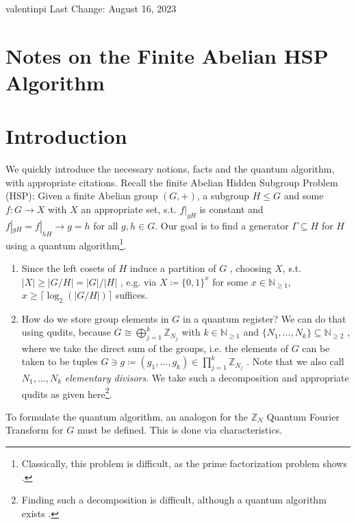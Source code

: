 \documentclass[10pt]{amsart}
\numberwithin{equation}{section}
\theoremstyle{definition}
\theoremstyle{remark}
\begin{document}
    valentinpi \hfill Last Change: August 16, 2023

    \section*{Notes on the Finite Abelian HSP Algorithm}

    \section{Introduction} \label{introduction}

    We quickly introduce the necessary notions, facts and the quantum algorithm, with appropriate citations. Recall the finite Abelian Hidden Subgroup Problem (HSP): Given a finite Abelian group \((G, +)\), a subgroup \(H \leq G\) and some \(f\colon G \to X\) with \(X\) an appropriate set, s.t. \(f|_{gH}\) is constant and \(f|_{gH}=f|_{hH} \rightarrow g = h\) for all \(g, h \in G\). Our goal is to find a generator \(\Gamma \subseteq H\) for \(H\) using a quantum algorithm\footnote{Classically, this problem is difficult, as the prime factorization problem shows \cite[p. 24]{Lomont}.}.

    \begin{enumerate}[label=(\roman*)]
        \item Since the left cosets of \(H\) induce a partition of \(G\) \cite[pp. 36-37]{Fischer}, choosing \(X\), s.t. \(|X| \geq |G/H| = |G|/|H|\) \cite[p. 38]{Fischer}, e.g. via \(X \coloneqq \{0, 1\}^{x}\) for some \(x \in \mathbb{N}_{\geq 1}\), \(x \geq \lceil \log_2(|G/H|) \rceil\) suffices.
        \item \label{introduction_1} How do we store group elements in \(G\) in a quantum register? We can do that using qudits, because \(G \cong \bigoplus_{j=1}^{k} \mathbb{Z}_{N_j}\) with \(k \in \mathbb{N}_{\geq 1}\) and \(\{N_1, ..., N_k\} \subseteq \mathbb{N}_{\geq 2}\) \cite[pp. 132-135]{Fischer}, where we take the direct sum of the groups, i.e. the elements of \(G\) can be taken to be tuples \(G \ni g \coloneqq (g_1,...,g_k) \in \prod_{j=1}^k \mathbb{Z}_{N_j}\) \cite[pp. 53-54]{Fischer}. Note that we also call \(N_1, ..., N_k\) \emph{elementary divisors}. We take such a decomposition and appropriate qudits as given here\footnote{Finding such a decomposition is difficult, although a quantum algorithm exists \cite[p. 17]{Lomont}.}.
    \end{enumerate}

    To formulate the quantum algorithm, an analogon for the \(\mathbb{Z}_N\) Quantum Fourier Transform for \(G\) must be defined. This is done via characteristics.
\end{document}
